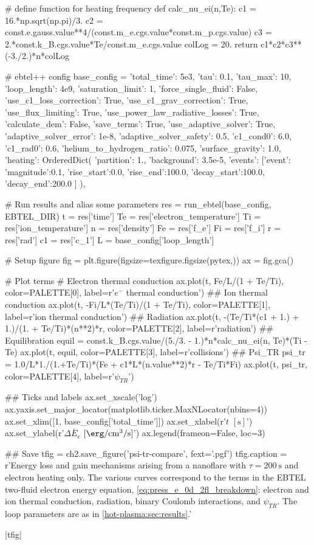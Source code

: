\begin{pycode}[chapter2]
# define function for heating frequency
def calc_nu_ei(n,Te):
    c1 = 16.*np.sqrt(np.pi)/3.
    c2 = const.e.gauss.value**4/(const.m_e.cgs.value*const.m_p.cgs.value)
    c3 = 2.*const.k_B.cgs.value*Te/const.m_e.cgs.value
    colLog = 20.
    return c1*c2*c3**(-3./2.)*n*colLog

# ebtel++ config
base_config = {
    'total_time': 5e3,
    'tau': 0.1,
    'tau_max': 10,
    'loop_length': 4e9,
    'saturation_limit': 1,
    'force_single_fluid': False,
    'use_c1_loss_correction': True,
    'use_c1_grav_correction': True,
    'use_flux_limiting': True,
    'use_power_law_radiative_losses': True,
    'calculate_dem': False,
    'save_terms': True,
    'use_adaptive_solver': True,
    'adaptive_solver_error': 1e-8,
    'adaptive_solver_safety': 0.5,
    'c1_cond0': 6.0,
    'c1_rad0': 0.6,
    'helium_to_hydrogen_ratio': 0.075,
    'surface_gravity': 1.0,
    'heating': OrderedDict({
        'partition': 1.,
        'background': 3.5e-5,
        'events': [{'event':{
            'magnitude':0.1,
            'rise_start':0.0,
            'rise_end':100.0,
            'decay_start':100.0,
            'decay_end':200.0}}
        ]
    }),
}

# Run results and alias some parameters
res = run_ebtel(base_config, EBTEL_DIR)
t = res['time']
Te = res['electron_temperature']
Ti = res['ion_temperature']
n = res['density']
Fe = res['f_e']
Fi = res['f_i']
r = res['rad']
c1 = res['c_1']
L = base_config['loop_length']

# Setup figure
fig = plt.figure(figsize=texfigure.figsize(pytex,))
ax = fig.gca()

# Plot terms
# Electron thermal conduction
ax.plot(t, Fe/L/(1 + Te/Ti), color=PALETTE[0], label=r'$e^-$ thermal conduction')
## Ion thermal conduction
ax.plot(t, -Fi/L*(Te/Ti)/(1 + Te/Ti), color=PALETTE[1], label=r'ion thermal conduction')
## Radiation
ax.plot(t, -(Te/Ti*(c1 + 1.) + 1.)/(1. + Te/Ti)*(n**2)*r, color=PALETTE[2], label=r'radiation')
## Equilibration
equil = const.k_B.cgs.value/(5./3. - 1.)*n*calc_nu_ei(n, Te)*(Ti - Te)
ax.plot(t, equil, color=PALETTE[3], label=r'collisions')
## Psi_TR
psi_tr = 1.0/L*1./(1.+Te/Ti)*(Fe + c1*L*(n.value**2)*r - Te/Ti*Fi)
ax.plot(t, psi_tr, color=PALETTE[4], label=r'$\psi_{TR}$')

## Ticks and labels
ax.set_xscale('log')
ax.yaxis.set_major_locator(matplotlib.ticker.MaxNLocator(nbins=4))
ax.set_xlim([1, base_config['total_time']])
ax.set_xlabel(r'$t$ $[\si{\second}]$')
ax.set_ylabel(r'$\Delta\bar{E}_e$ $[\si{\erg\per\cubic\cm\per\second}]$')
ax.legend(frameon=False, loc=3)
      
## Save
tfig = ch2.save_figure('psi-tr-compare', fext='.pgf')
tfig.caption = r'Energy loss and gain mechanisms arising from a nanoflare with $\tau=\SI{200}{\second}$ and electron heating only. The various curves correspond to the terms in the EBTEL two-fluid electron energy equation, \autoref{eq:press_e_0d_2fl_breakdown}: electron and ion thermal conduction, radiation, binary Coulomb interactions, and $\psi_{TR}$. The loop parameters are as in \autoref{hot-plasma:sec:results}.'
\end{pycode}
\py[chapter2]|tfig|

